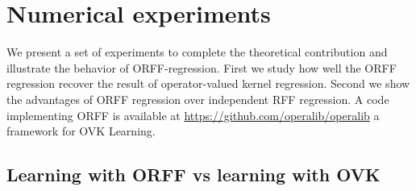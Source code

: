 \documentclass[twoside,11pt]{article}
\begin{document}
\section{Numerical experiments}
\label{sec:num_exp}
We present a set of experiments to complete the theoretical contribution and
illustrate the behavior of ORFF-regression. First we study how well the ORFF
regression recover the result of operator-valued kernel regression. Second we
show the advantages of ORFF regression over independent RFF regression. A code
implementing ORFF is available at \url{https://github.com/operalib/operalib} a
framework for OVK Learning.

\subsection{Learning with {ORFF} vs learning with {OVK}}
\end{document}
